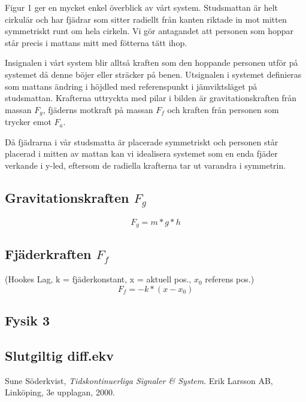 \documentclass[10pt,a4paper]{article}
\begin{document}
Figur 1 ger en mycket enkel överblick av vårt system. Studsmattan är helt cirkulär och har fjädrar som sitter radiellt från kanten riktade in mot mitten symmetriskt runt om hela cirkeln. Vi gör antagandet att personen som hoppar står precis i mattans mitt med fötterna tätt ihop.


Insignalen i vårt system blir alltså kraften som den hoppande personen utför på systemet då denne böjer eller sträcker på benen. Utsignalen i systemet definieras som mattans ändring i höjdled med referenspunkt i jämviktsläget på studsmattan.
Krafterna uttryckta med pilar i bilden är gravitationskraften från massan $F_g$, fjäderns motkraft på massan $F_f$ och kraften från personen som trycker emot $F_a$.

Då fjädrarna i vår studsmatta är placerade symmetriskt och personen står placerad i mitten av mattan kan vi idealisera systemet som en enda fjäder verkande i y-led, eftersom de radiella krafterna tar ut varandra i symmetrin.

\subsection{Gravitationskraften $F_g$}

\begin{equation}
F_g = m * g * h
\end{equation}

\subsection{Fjäderkraften $F_f$}

(Hookes Lag, k = fjäderkonstant, x = aktuell pos., $x_0$ referens pos.)
\begin{equation}
F_f = - k * (x - x_0)
\end{equation}

\subsection{Fysik 3}

\subsection{Slutgiltig diff.ekv}

\newpage

\begin{thebibliography}{9}

  Sune Söderkvist,
  \emph{Tidskontinuerliga Signaler \& System}.
  \linebreak
  Erik Larsson AB, Linköping,
  3e upplagan,
  2000.

\end{thebibliography}
\end{document}
